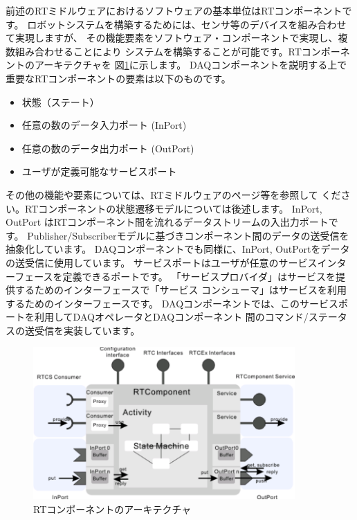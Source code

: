 \documentclass[a4j,10pt,dvips,onecolumn,oneside,final]{jarticle}%
\begin{document}
前述のRTミドルウェアにおけるソフトウェアの基本単位はRTコンポーネントです。
ロボットシステムを構築するためには、センサ等のデバイスを組み合わせて実現しますが、
その機能要素をソフトウェア・コンポーネントで実現し、複数組み合わせることにより
システムを構築することが可能です。RTコンポーネントのアーキテクチャを
図\ref{RT-component.fig}に示します。
DAQコンポーネントを説明する上で重要なRTコンポーネントの要素は以下のものです。
\begin{itemize}
\item 状態（ステート）
\item 任意の数のデータ入力ポート (InPort)
\item 任意の数のデータ出力ポート (OutPort)
\item ユーザが定義可能なサービスポート
\end{itemize}
その他の機能や要素については、RTミドルウェアのページ等\cite{RTM, RTM-book}を参照して
ください。RTコンポーネントの状態遷移モデルについては後述します。
InPort,  OutPort はRTコンポーネント間を流れるデータストリームの入出力ポートです。
Publisher/Subscriberモデルに基づきコンポーネント間のデータの送受信を抽象化しています。
DAQコンポーネントでも同様に、InPort,  OutPortをデータの送受信に使用しています。
サービスポートはユーザが任意のサービスインターフェースを定義できるポートです。
「サービスプロバイダ」はサービスを提供するためのインターフェースで「サービス
コンシューマ」はサービスを利用するためのインターフェースです。
DAQコンポーネントでは、このサービスポートを利用してDAQオペレータとDAQコンポーネント
間のコマンド/ステータスの送受信を実装しています。
\begin{figure}[htbp]
 \begin{center}
  \includegraphics[width=100mm]{RT-component.pdf}
  \caption{RTコンポーネントのアーキテクチャ}
  \label{RT-component.fig}
 \end{center}
\end{figure}
\end{document}
